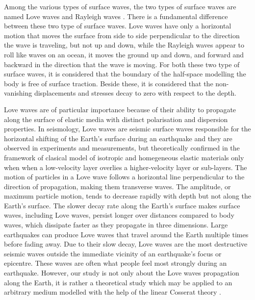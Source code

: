 \documentclass[10pt]{article}
\begin{document}
Among the various types of surface waves, the two types of surface waves are named Love waves \cite{Love1911} and Rayleigh waves \cite{Rayleigh}. There is a fundamental difference between these two type of surface waves. Love waves have only a horizontal motion that moves the surface from side to side perpendicular to the direction the wave is traveling, but not up and down, while the Rayleigh waves appear to roll like waves on an ocean,  it moves the ground up and down, and forward and backward in the direction that the wave is moving.  For both these two type of surface waves, it is considered that the boundary of the  half-space modelling the body is free of surface traction. Beside these, it is considered that the non-vanishing displacements and stresses decay to zero with respect to the  {depth}.




Love waves are of particular importance because of their ability to propagate along the surface of elastic media with distinct polarisation and dispersion properties. In seismology, Love waves are seismic surface waves responsible for the horizontal shifting of the Earth's surface during an earthquake and they  are observed in experiments and measurements, but theoretically confirmed in the framework of clasical model of  isotropic and homegeneous elastic materials only when when a low-velocity layer overlies a higher-velocity layer or sub-layers. The motion of particles in a Love wave follows a horizontal line perpendicular to the direction of propagation, making them transverse waves.  The amplitude, or maximum particle motion, tends to decrease rapidly with depth but not  along the Earth's surface. The slower decay rate along the Earth's surface makes surface waves, including Love waves, persist longer over distances compared to body waves, which dissipate faster as they propagate in three dimensions. Large earthquakes can produce Love waves that travel around the Earth multiple times before fading away.
Due to their slow decay, Love waves are the most destructive seismic waves outside the immediate vicinity of an earthquake's focus or epicentre. These waves are often what people feel most strongly during an earthquake.  {However, our} study is not only about the Love waves propagation along the Earth, it is rather a theoretical study which may be applied to an arbitrary medium modelled with the help of  {the} linear Cosserat theory \cite{Cosserat09,Eringen64,Mindlin64}. 
\end{document}
